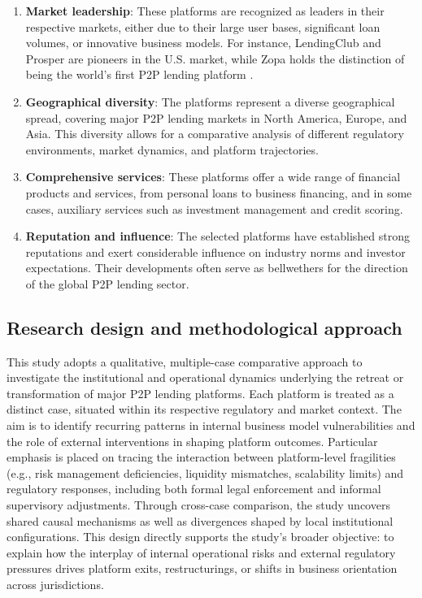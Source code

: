 \documentclass[pdflatex,sn-apa]{sn-jnl}%
\theoremstyle{thmstyleone}%
\theoremstyle{thmstyletwo}%
\theoremstyle{thmstylethree}%
\begin{document}
\begin{enumerate}
    \item \textbf{Market leadership}: These platforms are recognized as leaders in their respective markets, either due to their large user bases, significant loan volumes, or innovative business models. For instance, LendingClub and Prosper are pioneers in the U.S. market, while Zopa holds the distinction of being the world’s first P2P lending platform \citep{bednorz_history_2023}.
    
    \item \textbf{Geographical diversity}: The platforms represent a diverse geographical spread, covering major P2P lending markets in North America, Europe, and Asia. This diversity allows for a comparative analysis of different regulatory environments, market dynamics, and platform trajectories.
    
    \item \textbf{Comprehensive services}: These platforms offer a wide range of financial products and services, from personal loans to business financing, and in some cases, auxiliary services such as investment management and credit scoring. 
    
    \item \textbf{Reputation and influence}: The selected platforms have established strong reputations and exert considerable influence on industry norms and investor expectations. Their developments often serve as bellwethers for the direction of the global P2P lending sector.
\end{enumerate}

\subsection{Research design and methodological approach}
This study adopts a qualitative, multiple-case comparative approach to investigate the institutional and operational dynamics underlying the retreat or transformation of major P2P lending platforms. Each platform is treated as a distinct case, situated within its respective regulatory and market context. The aim is to identify recurring patterns in internal business model vulnerabilities and the role of external interventions in shaping platform outcomes. Particular emphasis is placed on tracing the interaction between platform-level fragilities (e.g., risk management deficiencies, liquidity mismatches, scalability limits) and regulatory responses, including both formal legal enforcement and informal supervisory adjustments. Through cross-case comparison, the study uncovers shared causal mechanisms as well as divergences shaped by local institutional configurations. This design directly supports the study’s broader objective: to explain how the interplay of internal operational risks and external regulatory pressures drives platform exits, restructurings, or shifts in business orientation across jurisdictions.
\end{document}
